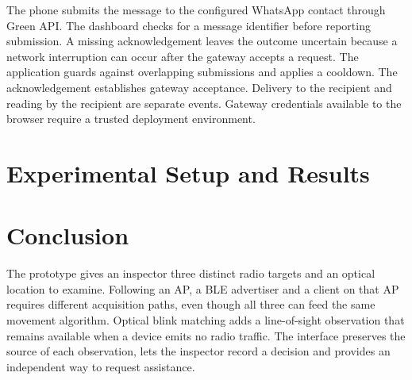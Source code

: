 \documentclass[conference]{IEEEtran}
\begin{document}
The phone submits the message to the configured WhatsApp contact through Green API. The dashboard checks for a message identifier before reporting submission. A missing acknowledgement leaves the outcome uncertain because a network interruption can occur after the gateway accepts a request. The application guards against overlapping submissions and applies a cooldown. The acknowledgement establishes gateway acceptance. Delivery to the recipient and reading by the recipient are separate events. Gateway credentials available to the browser require a trusted deployment environment.

\section{Experimental Setup and Results}

\section{Conclusion}
The prototype gives an inspector three distinct radio targets and an optical location to examine. Following an AP, a BLE advertiser and a client on that AP requires different acquisition paths, even though all three can feed the same movement algorithm. Optical blink matching adds a line-of-sight observation that remains available when a device emits no radio traffic. The interface preserves the source of each observation, lets the inspector record a decision and provides an independent way to request assistance.
\end{document}
